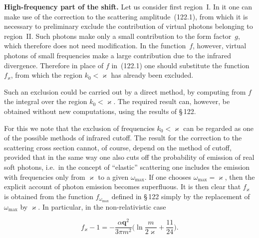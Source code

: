 \textbf{High-frequency part of the shift.} Let us consider first region~I. In it one can make use of the correction to the scattering amplitude~(122.1), from which it is necessary to preliminary exclude the contribution of virtual photons belonging to region~II. Such photons make only a small contribution to the form factor~$g$, which therefore does not need modification. In the function~$f$, however, virtual photons of small frequencies make a large contribution due to the infrared divergence. Therefore in place of $f$ in~(122.1) one should substitute the function~$f_\varkappa$, from which the region $k_0 < \varkappa$ has already been excluded.

Such an exclusion could be carried out by a direct method, by computing from $f$ the integral over the region $k_0 < \varkappa$. The required result can, however, be obtained without new computations, using the results of \S\,122.

For this we note that the exclusion of frequencies $k_0 < \varkappa$ can be regarded as one of the possible methods of infrared cutoff. The result for the correction to the scattering cross section cannot, of course, depend on the method of cutoff, provided that in the same way one also cuts off the probability of emission of real soft photons, i.e.\ in the concept of ``elastic'' scattering one includes the emission with frequencies only from $\varkappa$ to a given $\omega_{\max}$. If one chooses $\omega_{\max} = \varkappa$, then the explicit account of photon emission becomes superfluous. It is then clear that $f_\varkappa$ is obtained from the function $f_{\omega_{\max}}$ defined in \S\,122 simply by the replacement of $\omega_{\max}$ by $\varkappa$. In particular, in the non-relativistic case


\begin{equation}
f_\varkappa - 1 = -\frac{\alpha\mathbf{q}^2}{3\pi m^2}\biggl(\ln\frac{m}{2\varkappa} + \frac{11}{24}\biggr).
\label{eq:123.5}
\end{equation}

